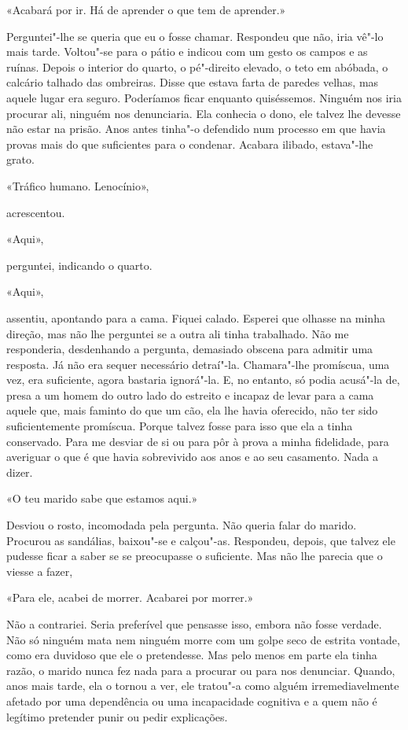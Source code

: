 «Acabará por ir. Há de aprender o que tem de aprender.»

Perguntei"-lhe se queria que eu o fosse chamar. Respondeu que não, iria
vê"-lo mais tarde. Voltou"-se para o pátio e indicou com um gesto os
campos e as ruínas. Depois o interior do quarto, o pé"-direito elevado,
o teto em abóbada, o calcário talhado das ombreiras. Disse que estava
farta de paredes velhas, mas aquele lugar era seguro. Poderíamos ficar
enquanto quiséssemos. Ninguém nos iria procurar ali, ninguém nos
denunciaria. Ela conhecia o dono, ele talvez lhe devesse não estar na
prisão. Anos antes tinha"-o defendido num processo em que havia provas
mais do que suficientes para o condenar. Acabara ilibado, estava"-lhe
grato.

«Tráfico humano. Lenocínio»,

acrescentou.

«Aqui»,

perguntei, indicando o quarto.

«Aqui»,

assentiu, apontando para a cama. Fiquei calado. Esperei que olhasse na
minha direção, mas não lhe perguntei se a outra ali tinha trabalhado.
Não me responderia, desdenhando a pergunta, demasiado obscena para
admitir uma resposta. Já não era sequer necessário detraí"-la.
Chamara"-lhe promíscua, uma vez, era suficiente, agora bastaria
ignorá"-la. E, no entanto, só podia acusá"-la de, presa a um homem do
outro lado do estreito e incapaz de levar para a cama aquele que, mais
faminto do que um cão, ela lhe havia oferecido, não ter sido
suficientemente promíscua. Porque talvez fosse para isso que ela a tinha
conservado. Para me desviar de si ou para pôr à prova a minha
fidelidade, para averiguar o que é que havia sobrevivido aos anos e ao
seu casamento. Nada a dizer.

«O teu marido sabe que estamos aqui.»

Desviou o rosto, incomodada pela pergunta. Não queria falar do marido.
Procurou as sandálias, baixou"-se e calçou"-as. Respondeu, depois, que
talvez ele pudesse ficar a saber se se preocupasse o suficiente. Mas não
lhe parecia que o viesse a fazer,

«Para ele, acabei de morrer. Acabarei por morrer.»

Não a contrariei. Seria preferível que pensasse isso, embora não fosse
verdade. Não só ninguém mata nem ninguém morre com um golpe seco de
estrita vontade, como era duvidoso que ele o pretendesse. Mas pelo menos
em parte ela tinha razão, o marido nunca fez nada para a procurar ou
para nos denunciar. Quando, anos mais tarde, ela o tornou a ver, ele
tratou"-a como alguém irremediavelmente afetado por uma dependência ou
uma incapacidade cognitiva e a quem não é legítimo pretender punir ou
pedir explicações.

